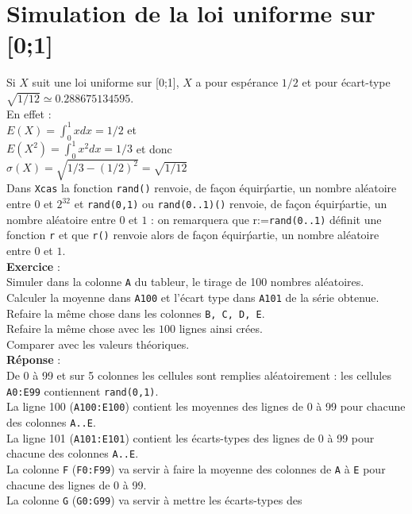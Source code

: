 \documentclass[a4paper,11pt]{book}
\begin{document}
\section{Simulation de la loi uniforme sur [0;1]}
Si $X$ suit une loi uniforme sur [0;1], $X$ a pour esp\'erance $1/2$ et pour 
\'ecart-type $\sqrt{1/12} \simeq 0.288675134595$.\\
En effet :\\
$E(X)=\int_0^1xdx=1/2$ et \\
$E(X^2)=\int_0^1x^2dx=1/3$ et donc\\
$\sigma(X)=\sqrt{1/3-(1/2)^2}=\sqrt{1/12}$\\
Dans {\tt Xcas} la fonction {\tt rand()} renvoie, de fa\c{c}on \'equir\'partie,
un nombre al\'eatoire entre $0$ et $2^{32}$ et 
{\tt rand(0,1)} ou {\tt rand(0..1)()} renvoie, de fa\c{c}on \'equir\'partie, un
 nombre al\'eatoire entre $0$ et $1$ : on remarquera que r:={\tt rand(0..1)}
d\'efinit une fonction {\tt r} et que {\tt r()} renvoie alors  de fa\c{c}on 
\'equir\'partie, un nombre al\'eatoire entre $0$ et $1$.\\
{\bf Exercice }:\\
Simuler dans la colonne {\tt A} du tableur, le tirage de 100 nombres 
al\'eatoires.\\
Calculer la moyenne dans {\tt A100} et l'\'ecart type dans 
{\tt A101} de la s\'erie obtenue.\\
Refaire la m\^eme chose dans les colonnes {\tt B, C, D, E}.\\ 
Refaire la m\^eme chose avec les $100$ lignes ainsi cr\'ees.\\ 
Comparer avec les valeurs th\'eoriques.\\
{\bf R\'eponse} :\\
De 0 \`a 99 et sur 5 colonnes les cellules sont remplies al\'eatoirement : les
cellules {\tt A0:E99} contiennent {\tt rand(0,1)}.\\
La ligne 100 ({\tt A100:E100}) contient les moyennes des lignes de 0 \`a 99
pour chacune des  colonnes  {\tt A..E}.\\%
La ligne 101 ({\tt A101:E101}) contient les \'ecarts-types des lignes de 
0 \`a 99 pour chacune des colonnes {\tt A..E}.\\
La colonne {\tt F} ({\tt F0:F99}) va servir \`a faire la moyenne des colonnes 
de {\tt A} \`a {\tt E} pour chacune des lignes de 0 \`a 99.\\
La colonne {\tt G} ({\tt G0:G99}) va servir \`a mettre les \'ecarts-types des
\end{document}
